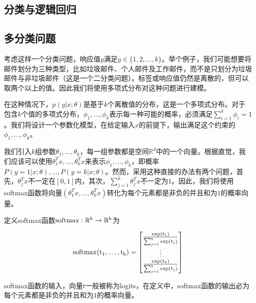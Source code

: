 \documentclass[letterpaper,11pt]{report}
\numberwithin{equation}{section}
\begin{document}
\begin{CJK}{UTF8}{gbsn}
  \chapter{分类与逻辑回归}

  \section{多分类问题}

  考虑这样一个分类问题，响应值$y$满足$y\in\{1,2,\ldots,k\}$。举个例子，我们可能想要将邮件划分为三种类型，比如垃圾邮件、个人邮件及工作邮件，而不是只划分为垃圾邮件与非垃圾邮件（这是一个二分类问题）。标签或响应值仍然是离散的，但可以取两个以上的值。因此我们将使用多项式分布对这种问题进行建模。

  在这种情况下，$p(y | x;\theta)$是基于$k$个离散值的分布，这是一个多项式分布。对于包含$k$个值的多项式分布，$\phi_1,\ldots,\phi_k$表示每一种可能的概率，必须满足$\sum^k_{i=1}\phi_i=1$。我们将设计一个参数化模型，在给定输入$x$的前提下，输出满足这个约束的$\phi_1,\ldots,\phi_k$。

  我们引入$k$组参数$\theta_1,\ldots,\theta_k$，每一组参数都是空间$\mathbb{R}^d$中的一个向量。根据直觉，我们应该可以使用$\theta_1^Tx,\ldots,\theta_k^Tx$来表示$\phi_1,\ldots,\phi_k$，即概率$P(y=1 | x;\theta),\ldots,P(y=k | x;\theta)$。然而，采用这种直接的办法有两个问题，首先，$\theta_j^Tx$不一定在$[0,1]$内，其次，$\sum^k_{j=1}\theta_j^Tx$不一定为$1$。因此，我们将使用softmax函数将向量$(\theta_1^T x,\ldots,\theta_k^T x)$转化为每个元素都是非负的并且和为$1$的概率向量。

  定义softmax函数$\rm{softmax}:\mathbb{R}^k \rightarrow \mathbb{R}^k$为

  \begin{equation}
    \rm{softmax}(t_1,\ldots,t_k)=
    \begin{bmatrix}
      \frac{{\rm{exp}} (t_1)}{\sum^k_{j=1}{\rm{exp}} (t_j)} \\
      \vdots                                                \\
      \frac{{\rm{exp}} (t_k)}{\sum^k_{j=1}{\rm{exp}} (t_j)} \\
    \end{bmatrix}
  \end{equation}

  softmax函数的输入，向量$t$一般被称为logits，在定义中，softmax函数的输出必为每个元素都是非负的并且和为$1$的概率向量。


\end{CJK}
\end{document}
